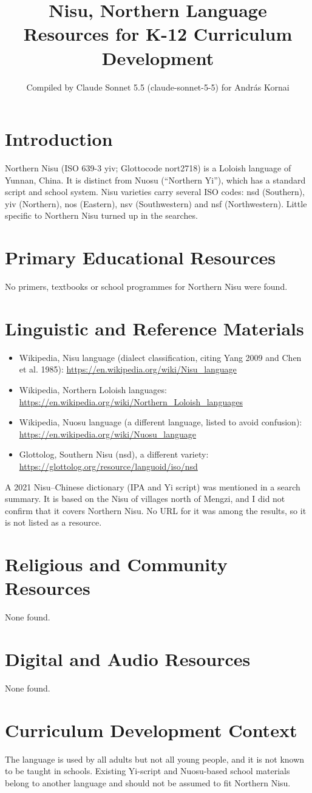 \documentclass[12pt]{article}
\title{Nisu, Northern Language Resources for K-12 Curriculum Development}
\author{Compiled by Claude Sonnet 5.5 (claude-sonnet-5-5) for Andr\'as Kornai}
\date{}
\begin{document}
\maketitle

\section{Introduction}
Northern Nisu (ISO 639-3 yiv; Glottocode nort2718) is a Loloish language of Yunnan, China. It is distinct from Nuosu (``Northern Yi''), which has a standard script and school system. Nisu varieties carry several ISO codes: nsd (Southern), yiv (Northern), nos (Eastern), nsv (Southwestern) and nsf (Northwestern). Little specific to Northern Nisu turned up in the searches.

\section{Primary Educational Resources}
No primers, textbooks or school programmes for Northern Nisu were found.

\section{Linguistic and Reference Materials}
\begin{itemize}
\item Wikipedia, Nisu language (dialect classification, citing Yang 2009 and Chen et al. 1985): \url{https://en.wikipedia.org/wiki/Nisu_language}
\item Wikipedia, Northern Loloish languages: \url{https://en.wikipedia.org/wiki/Northern_Loloish_languages}
\item Wikipedia, Nuosu language (a different language, listed to avoid confusion): \url{https://en.wikipedia.org/wiki/Nuosu_language}
\item Glottolog, Southern Nisu (nsd), a different variety: \url{https://glottolog.org/resource/languoid/iso/nsd}
\end{itemize}
A 2021 Nisu--Chinese dictionary (IPA and Yi script) was mentioned in a search summary. It is based on the Nisu of villages north of Mengzi, and I did not confirm that it covers Northern Nisu. No URL for it was among the results, so it is not listed as a resource.

\section{Religious and Community Resources}
None found.

\section{Digital and Audio Resources}
None found.

\section{Curriculum Development Context}
The language is used by all adults but not all young people, and it is not known to be taught in schools. Existing Yi-script and Nuosu-based school materials belong to another language and should not be assumed to fit Northern Nisu.
\end{document}
